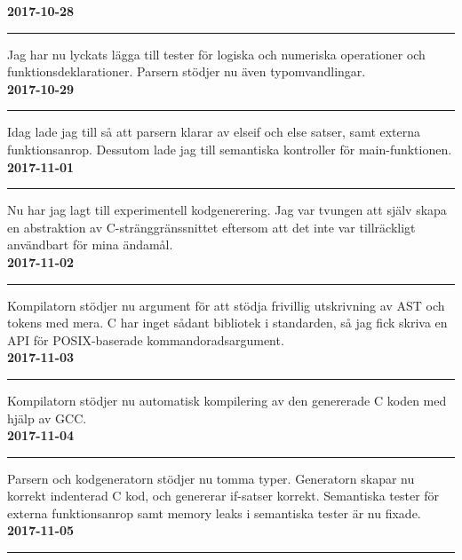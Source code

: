 \documentclass{theme}
\begin{document}
\noindent\textbf{2017-10-28}\\
\noindent\rule{\textwidth}{1pt}

\noindent 
Jag har nu lyckats lägga till tester för logiska och numeriska operationer och
funktionsdeklarationer. Parsern stödjer nu även typomvandlingar.\\

\noindent\textbf{2017-10-29}\\
\noindent\rule{\textwidth}{1pt}

\noindent 
Idag lade jag till så att parsern klarar av elseif och else satser, samt externa
funktionsanrop. Dessutom lade jag till semantiska kontroller för 
main-funktionen.\\

\noindent\textbf{2017-11-01}\\
\noindent\rule{\textwidth}{1pt}

\noindent 
Nu har jag lagt till experimentell kodgenerering. Jag var tvungen att själv 
skapa en abstraktion av C-stränggränssnittet eftersom att det inte var 
tillräckligt användbart för mina ändamål. \\

\noindent\textbf{2017-11-02}\\
\noindent\rule{\textwidth}{1pt}

\noindent 
Kompilatorn stödjer nu argument för att stödja frivillig utskrivning av AST och 
tokens med mera. C har inget sådant bibliotek i standarden, så jag fick skriva 
en API för POSIX-baserade kommandoradsargument.\\

\noindent\textbf{2017-11-03}\\
\noindent\rule{\textwidth}{1pt}

\noindent 
Kompilatorn stödjer nu automatisk kompilering av den genererade C koden med 
hjälp av GCC. \\

\noindent\textbf{2017-11-04}\\
\noindent\rule{\textwidth}{1pt}

\noindent 
Parsern och kodgeneratorn stödjer nu tomma typer. Generatorn skapar nu korrekt 
indenterad C kod, och genererar if-satser korrekt. Semantiska tester för externa
funktionsanrop samt memory leaks i semantiska tester är nu fixade. \\

\noindent\textbf{2017-11-05}\\
\noindent\rule{\textwidth}{1pt}
\end{document}
